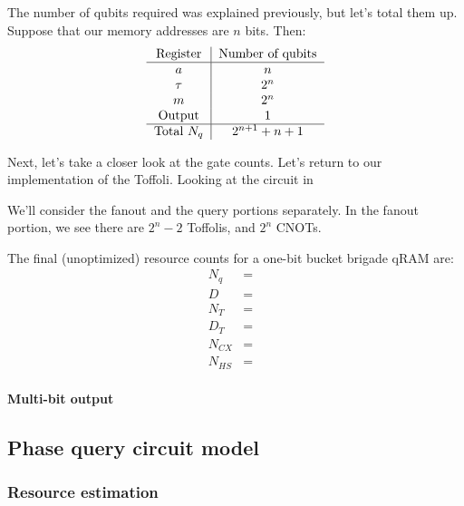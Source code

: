 \documentclass[a4paper,12pt]{article}
\begin{document}
The number of qubits required was explained previously, but let's total them up. Suppose that our memory addresses are $n$ bits. Then:
\begin{equation}
 \begin{tabular}{c|c}
  Register & Number  of qubits \\ \hline
  $a$ & $n$ \\
  $\tau$ & $2^n$ \\
  $m$ & $2^n$ \\
  Output & 1 \\ \hline
  Total $N_q$ & $2^{n+1} + n + 1$
 \end{tabular}
\end{equation} 

Next, let's take a closer look at the gate counts. Let's return to our implementation of the Toffoli. Looking at the circuit in 

We'll consider the fanout and the query portions separately. In the fanout portion, we see there are $2^n - 2$ Toffolis, and $2^n$ CNOTs. 

The final (unoptimized) resource counts for a one-bit bucket brigade qRAM are:
\begin{eqnarray}
 N_q &=& \\ \nonumber
 D   &=& \\ \nonumber
 N_T &=& \\ \nonumber
 D_T &=& \\ \nonumber
 N_{CX} &=& \\ \nonumber
 N_{HS} &=&
\end{eqnarray}


\paragraph{Multi-bit output}


\subsection{Phase query circuit model}

\subsubsection{Resource estimation}


\end{document}
